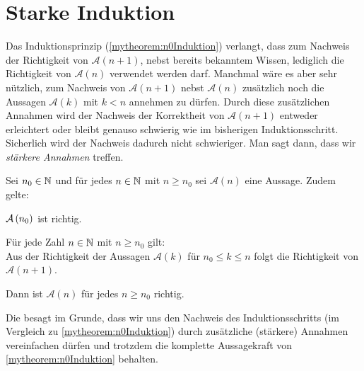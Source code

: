 \clearpage

\section{Starke Induktion}
Das Induktionsprinzip (\cref{mytheorem:n0Induktion}) verlangt, dass zum Nachweis der Richtigkeit von $\mathcal{A}(n+1)$, nebst bereits bekanntem Wissen, lediglich die Richtigkeit von $\mathcal{A}(n)$ verwendet werden darf. Manchmal wäre es aber sehr nützlich, zum Nachweis von $\mathcal{A}(n+1)$ nebst $\mathcal{A}(n)$ zusätzlich noch die Aussagen $\mathcal{A}(k)$ mit $k<n$ annehmen zu dürfen. Durch diese zusätzlichen Annahmen wird der Nachweis der Korrektheit von $\mathcal{A}(n+1)$ entweder erleichtert oder bleibt genauso schwierig wie im bisherigen Induktionsschritt. Sicherlich wird der Nachweis dadurch nicht schwieriger. Man sagt dann, dass wir \textit{stärkere Annahmen} treffen.

\begin{mytheorem}\label{mytheorem:starkeInduktion}
	Sei $n_0\in\mathbb{N}$ und für jedes $n\in\mathbb{N}$ mit $n\geq n_0$ sei $\mathcal{A}(n)$ eine Aussage. Zudem gelte:
	\begin{renum}
		\item $\mathcal{A}\left(n_0\right)$ ist richtig.
		\item Für jede Zahl $n\in\mathbb{N}$ mit $n\geq n_0$ gilt:\\
		Aus der Richtigkeit der Aussagen $\mathcal{A}(k)$ für $n_0\leq k\leq n$ folgt die Richtigkeit von $\mathcal{A}(n+1)$.
	\end{renum}
	Dann ist $\mathcal{A}(n)$ für jedes $n\geq n_0$ richtig.
\end{mytheorem}
\begin{myremark}
	Die  besagt im Grunde, dass wir uns den Nachweis des Induktionsschritts (im Vergleich zu \cref{mytheorem:n0Induktion}) durch zusätzliche (stärkere) Annahmen vereinfachen dürfen und trotzdem die komplette Aussagekraft von \cref{mytheorem:n0Induktion} behalten.
\end{myremark}

